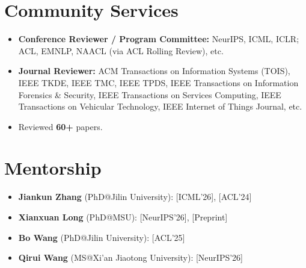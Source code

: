 \documentclass[12pt,letterpaper]{article}
\begin{document}
\section{Community Services}
\begin{itemize}
  \item \textbf{Conference Reviewer / Program Committee:} NeurIPS, ICML, ICLR; ACL, EMNLP, NAACL
        (via ACL Rolling Review), etc.
  \item \textbf{Journal Reviewer:} ACM Transactions on Information Systems (TOIS), IEEE TKDE,
        IEEE TMC, IEEE TPDS, IEEE Transactions on Information Forensics \& Security,
        IEEE Transactions on Services Computing, IEEE Transactions on Vehicular Technology,
        IEEE Internet of Things Journal, etc.
  \item Reviewed \textbf{60+} papers.
\end{itemize}

\section{Mentorship}
\begin{itemize}
  \item \textbf{Jiankun Zhang} (PhD@Jilin University): [ICML'26], [ACL'24]
  \item \textbf{Xianxuan Long} (PhD@MSU): [NeurIPS'26], [Preprint]
  \item \textbf{Bo Wang} (PhD@Jilin University): [ACL'25]
  \item \textbf{Qirui Wang} (MS@Xi'an Jiaotong University): [NeurIPS'26]
\end{itemize}
\end{document}
